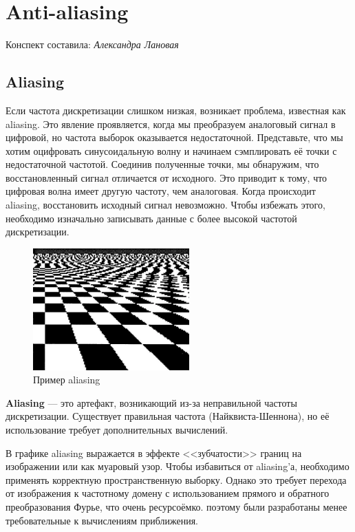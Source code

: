 \section{Anti-aliasing}
\begin{center}
    Конспект составила: \textit{Александра Лановая}
\end{center}

\subsection{Aliasing}
Если частота дискретизации слишком низкая, возникает проблема, известная как aliasing. Это явление проявляется, когда мы преобразуем аналоговый сигнал в цифровой, но частота выборок оказывается недостаточной. Представьте, что мы хотим оцифровать синусоидальную волну и начинаем сэмплировать её точки с недостаточной частотой. Соединив полученные точки, мы обнаружим, что восстановленный сигнал отличается от исходного. Это приводит к тому, что цифровая волна имеет другую частоту, чем аналоговая. Когда происходит aliasing, восстановить исходный сигнал невозможно. Чтобы избежать этого, необходимо изначально записывать данные с более высокой частотой дискретизации.

\begin{figure}[H]
    \centering
    \includegraphics[width = 6cm]{1.png}
    \caption{Пример aliasing}
    \label{fig:float}
\end{figure}

\textbf{Aliasing }— это артефакт, возникающий из-за неправильной частоты дискретизации. Существует правильная частота (Найквиста-Шеннона), но её использование требует дополнительных вычислений.

В графике aliasing выражается в эффекте <<зубчатости>> границ на изображении или как муаровый узор. Чтобы избавиться от aliasing'а, необходимо применять корректную пространственную выборку. Однако это требует перехода от изображения к частотному домену с использованием прямого и обратного преобразования Фурье, что очень ресурсоёмко. поэтому были разработаны менее требовательные к вычислениям приближения.

